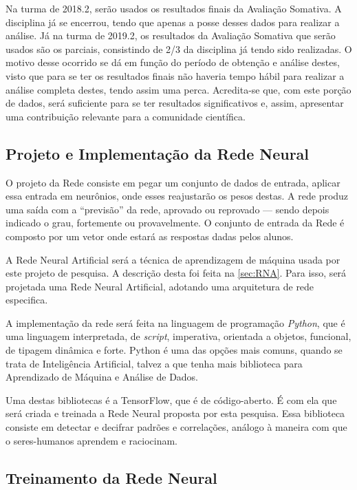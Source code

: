\documentclass[
	12pt,				%
	openright,			%
	oneside,
	a4paper,			%
	english,			%
	french,				%
	spanish,			%
	brazil,				%
	]{abntex2}
\begin{document}
Na turma de 2018.2, serão usados os resultados finais da Avaliação Somativa. A disciplina já se encerrou, tendo que apenas a posse desses dados para realizar a análise. Já na turma de 2019.2, os resultados da Avaliação Somativa que serão usados são os parciais, consistindo de 2/3 da disciplina já tendo sido realizadas. O motivo desse ocorrido se dá em função do período de obtenção e análise destes, visto que para se ter os resultados finais não haveria tempo hábil para realizar a análise completa destes, tendo assim uma perca. Acredita-se que, com este porção de dados, será suficiente para se ter resultados significativos e, assim, apresentar uma contribuição relevante para a comunidade científica.
 
\subsection{Projeto e Implementação da Rede Neural}

O projeto da Rede consiste em pegar um conjunto de dados de entrada, aplicar essa entrada em neurônios, onde esses reajustarão os pesos destas. A rede produz uma saída com a ``previsão'' da rede, aprovado ou reprovado --- sendo depois indicado o grau, fortemente ou provavelmente. O conjunto de entrada da Rede é composto por um vetor onde estará as respostas dadas pelos alunos.

A Rede Neural Artificial será a técnica de aprendizagem de máquina usada por este projeto de pesquisa. A descrição desta foi feita na \autoref{sec:RNA}. Para isso, será projetada uma Rede Neural Artificial, adotando uma arquitetura de rede especifica.

A implementação da rede será feita na linguagem de programação \textit{Python}, que é uma linguagem interpretada, de \textit{script}, imperativa, orientada a objetos, funcional, de tipagem dinâmica e forte. Python é uma das opções mais comuns, quando se trata de Inteligência Artificial, talvez a que tenha mais biblioteca para Aprendizado de Máquina e Análise de Dados.

Uma destas bibliotecas é a TensorFlow, que é de código-aberto. É com ela que será criada e treinada a Rede Neural proposta por esta pesquisa. Essa biblioteca consiste em detectar e decifrar padrões e correlações, análogo à maneira com que o seres-humanos aprendem e raciocinam.

\subsection{Treinamento da Rede Neural}
\end{document}
